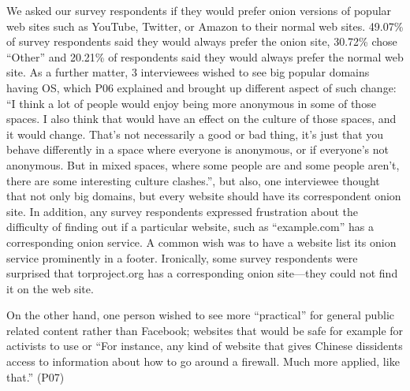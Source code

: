 We asked our survey respondents if they would prefer onion versions of popular web sites such as
YouTube, Twitter, or Amazon to their normal web
sites. 49.07\% of survey respondents said they
would always prefer the onion site, 30.72\% chose ``Other'' and 20.21\% of
respondents said they would always prefer the normal web site. As a further matter, 3 interviewees wished to see big popular domains having OS, which P06 explained and brought up different aspect of such change: ``I think a lot of people would enjoy being more anonymous in some of those spaces. I also think that would have an effect on the culture of those spaces, and it would change. That's not necessarily a good or bad thing, it's just that you behave differently in a space where everyone is anonymous, or if everyone's not anonymous. But in mixed spaces, where some people are and some people aren't, there are some interesting culture clashes.'', but also, one interviewee thought that not only big domains, but every website should have its correspondent onion site. In addition, any survey respondents expressed frustration about the difficulty of finding out if a particular website, such as 
``example.com'' has a corresponding onion service.  A common wish was to have
a website list its onion service prominently in a footer.  Ironically, some
survey respondents were surprised that torproject.org has a corresponding onion
site---they could not find it on the web site.


 On the other hand, one person wished to see more ``practical'' for general public related content rather than Facebook; websites that would be safe for example for activists to use or ``For instance, any kind of website that gives Chinese dissidents access to information about how to go around a firewall. Much more applied, like that.'' (P07)

